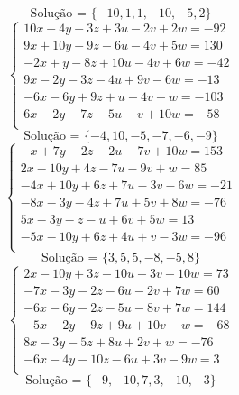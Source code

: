 \documentclass[12pt,oneside,a4paper]{article}
\begin{document}
\begin{equation*}
\text{Solução = }\{-10,1,1,-10,-5,2\}
\end{equation*}
\vspace{\baselineskip}
\begin{equation*}
\begin{cases}
10x-4y-3z+3u-2v+2w=-92 \\
9x+10y-9z-6u-4v+5w=130 \\
-2x+y-8z+10u-4v+6w=-42 \\
9x-2y-3z-4u+9v-6w=-13 \\
-6x-6y+9z+u+4v-w=-103 \\
6x-2y-7z-5u-v+10w=-58 \\
\end{cases}
\end{equation*}
\begin{equation*}
\text{Solução = }\{-4,10,-5,-7,-6,-9\}
\end{equation*}
\vspace{\baselineskip}
\begin{equation*}
\begin{cases}
-x+7y-2z-2u-7v+10w=153 \\
2x-10y+4z-7u-9v+w=85 \\
-4x+10y+6z+7u-3v-6w=-21 \\
-8x-3y-4z+7u+5v+8w=-76 \\
5x-3y-z-u+6v+5w=13 \\
-5x-10y+6z+4u+v-3w=-96 \\
\end{cases}
\end{equation*}
\begin{equation*}
\text{Solução = }\{3,5,5,-8,-5,8\}
\end{equation*}
\vspace{\baselineskip}
\begin{equation*}
\begin{cases}
2x-10y+3z-10u+3v-10w=73 \\
-7x-3y-2z-6u-2v+7w=60 \\
-6x-6y-2z-5u-8v+7w=144 \\
-5x-2y-9z+9u+10v-w=-68 \\
8x-3y-5z+8u+2v+w=-76 \\
-6x-4y-10z-6u+3v-9w=3 \\
\end{cases}
\end{equation*}
\begin{equation*}
\text{Solução = }\{-9,-10,7,3,-10,-3\}
\end{equation*}
\end{document}

